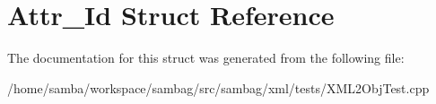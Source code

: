 \hypertarget{struct_attr___id}{
\section{Attr\_\-Id Struct Reference}
\label{struct_attr___id}
}


The documentation for this struct was generated from the following file:\begin{DoxyCompactItemize}
\item 
/home/samba/workspace/sambag/src/sambag/xml/tests/XML2ObjTest.cpp\end{DoxyCompactItemize}
